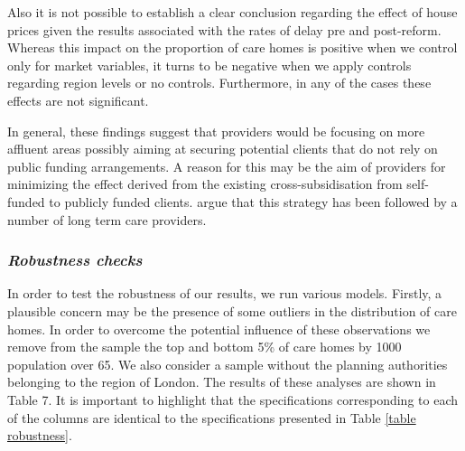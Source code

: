 \documentclass[12pt,letterpaper]{article}
\begin{document}
Also it is not possible to establish a clear conclusion regarding the effect of house prices
 given the results associated with the rates of delay pre and post-reform. Whereas this impact on the 
 proportion of care homes is positive when we control only for market variables, it turns to be negative 
 when we apply controls regarding region levels or no controls. Furthermore, in any of the cases these 
 effects are not significant. 
 
In general, these findings suggest that providers would be focusing on more affluent areas possibly 
aiming at securing potential clients that do not rely on public funding arrangements. A reason for
 this may be the aim of providers for minimizing the effect derived from the existing cross-subsidisation
  from self-funded to publicly funded clients. \cite{humphries2016social} argue that this strategy has been followed 
  by a number of long term care providers. 
  
 \subsubsection*{\normalsize{\it Robustness checks}}
 
In order to test the robustness of our results, we run various models.
 Firstly, a plausible concern may be the presence of some outliers in
  the distribution of care homes. In order to overcome the potential influence 
  of these observations we remove from the sample the top and bottom 5\% of care homes by 1000 population 
  over 65. We also consider a sample without the planning authorities belonging to the region of London.
   The results of these analyses are shown in Table 7. It is important to highlight that the specifications 
   corresponding to each of the columns are identical to the specifications presented in Table 
   \ref{table robustness}.
 
\end{document}
